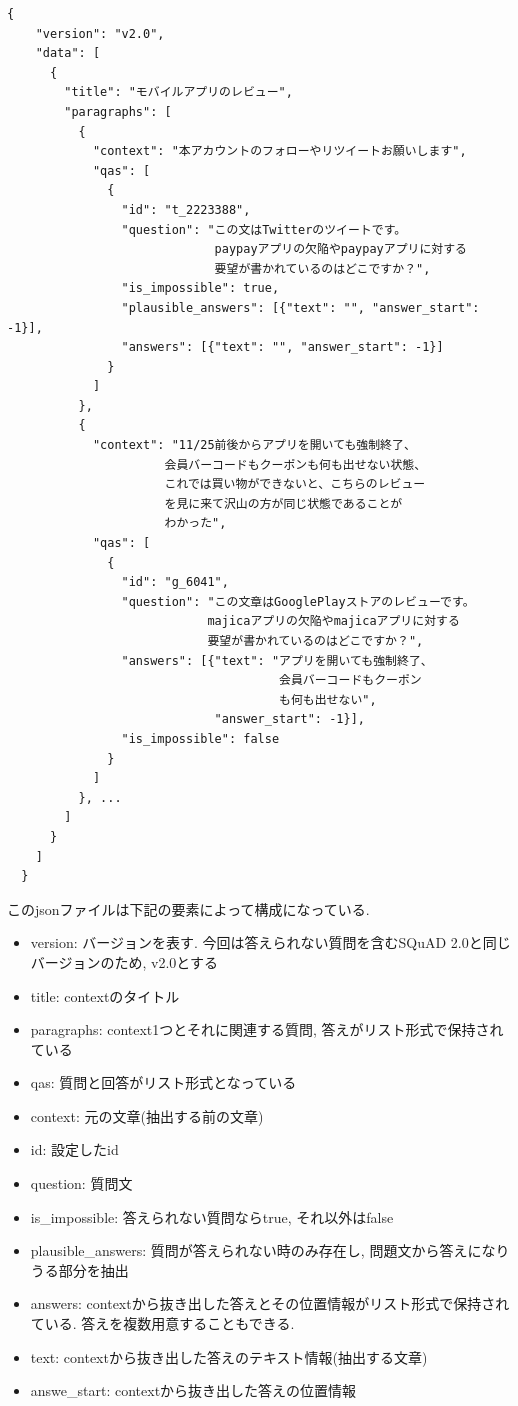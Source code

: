 \begin{lstlisting}[caption=データセット.json,label=json]
  {
    "version": "v2.0", 
    "data": [
      {
        "title": "モバイルアプリのレビュー", 
        "paragraphs": [
          {
            "context": "本アカウントのフォローやリツイートお願いします",
            "qas": [
              {
                "id": "t_2223388",
                "question": "この文はTwitterのツイートです。
                             paypayアプリの欠陥やpaypayアプリに対する
                             要望が書かれているのはどこですか？",
                "is_impossible": true,
                "plausible_answers": [{"text": "", "answer_start": -1}],
                "answers": [{"text": "", "answer_start": -1}]
              }
            ]
          },
          {
            "context": "11/25前後からアプリを開いても強制終了、
                      会員バーコードもクーポンも何も出せない状態、
                      これでは買い物ができないと、こちらのレビュー
                      を見に来て沢山の方が同じ状態であることが
                      わかった",
            "qas": [
              {
                "id": "g_6041", 
                "question": "この文章はGooglePlayストアのレビューです。
                            majicaアプリの欠陥やmajicaアプリに対する
                            要望が書かれているのはどこですか？",
                "answers": [{"text": "アプリを開いても強制終了、
                                      会員バーコードもクーポン
                                      も何も出せない", 
                             "answer_start": -1}], 
                "is_impossible": false
              }
            ]
          }, ...
        ]
      }
    ]
  } 
\end{lstlisting}

このjsonファイルは下記の要素によって構成になっている. 

\begin{itemize}
  \item version: バージョンを表す. 今回は答えられない質問を含むSQuAD 2.0と同じバージョンのため, v2.0とする
  \item title: contextのタイトル
  \item paragraphs: context1つとそれに関連する質問, 答えがリスト形式で保持されている
  \item qas: 質問と回答がリスト形式となっている
  \item context: 元の文章(抽出する前の文章)
  \item id: 設定したid
  \item question: 質問文
  \item is\_impossible: 答えられない質問ならtrue, それ以外はfalse
  \item plausible\_answers: 質問が答えられない時のみ存在し, 問題文から答えになりうる部分を抽出
  \item answers: contextから抜き出した答えとその位置情報がリスト形式で保持されている. 答えを複数用意することもできる. 
  \item text: contextから抜き出した答えのテキスト情報(抽出する文章)
  \item answe\_start: contextから抜き出した答えの位置情報
\end{itemize}

